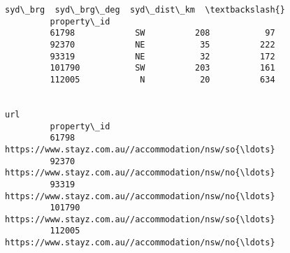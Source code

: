 \documentclass[11pt]{article}
\begin{document}
\begin{Verbatim}[commandchars=\\\{\}]
                     syd\_brg  syd\_brg\_deg  syd\_dist\_km  \textbackslash{}
         property\_id                                     
         61798            SW          208           97   
         92370            NE           35          222   
         93319            NE           32          172   
         101790           SW          203          161   
         112005            N           20          634   
         
                                                                    url  
         property\_id                                                     
         61798        https://www.stayz.com.au//accommodation/nsw/so{\ldots}  
         92370        https://www.stayz.com.au//accommodation/nsw/no{\ldots}  
         93319        https://www.stayz.com.au//accommodation/nsw/no{\ldots}  
         101790       https://www.stayz.com.au//accommodation/nsw/so{\ldots}  
         112005       https://www.stayz.com.au//accommodation/nsw/no{\ldots}  
\end{Verbatim}
            
\end{document}
